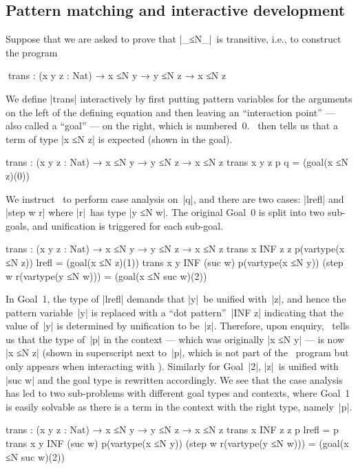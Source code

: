 \subsection{Pattern matching and interactive development}
\label{sec:interaction}

Suppose that we are asked to prove that |_≤N_|~is transitive, i.e., to construct the program
\begin{code}
^^^trans : (x y z : Nat) → x ≤N y → y ≤N z → x ≤N z
\end{code}
We define |trans| interactively by first putting pattern variables for the arguments on the left of the defining equation and then leaving an ``interaction point'' --- also called a ``goal'' --- on the right, which is numbered~0.
\Agda\ then tells us that a term of type |x ≤N z| is expected (shown in the goal).
\begin{code}
trans : (x y z : Nat) → x ≤N y → y ≤N z → x ≤N z
trans x y z p q = (goal(x ≤N z)(0))
\end{code}
We instruct \Agda\ to perform case analysis on~|q|, and there are two cases: |lrefl| and |step w r| where |r|~has type |y ≤N w|.
The original Goal~0 is split into two sub-goals, and unification is triggered for each sub-goal.
\begin{code}
trans : (x y z : Nat) → x ≤N y → y ≤N z → x ≤N z
trans x  INF  z        z        p(vartype(x ≤N z))  lrefl                        = (goal(x ≤N z)(1))
trans x       y   INF  (suc w)  p(vartype(x ≤N y))  (step w r(vartype(y ≤N w)))  = (goal(x ≤N suc w)(2))
\end{code}
In Goal~1, the type of |lrefl| demands that |y|~be unified with~|z|, and hence the pattern variable~|y| is replaced with a ``dot pattern''~|INF z| indicating that the value of~|y| is determined by unification to be~|z|.
Therefore, upon enquiry, \Agda\ tells us that the type of~|p| in the context --- which was originally |x ≤N y| --- is now |x ≤N z| (shown in superscript next to~|p|, which is not part of the \Agda\ program but only appears when interacting with \Agda).
Similarly for Goal~|2|, |z|~is unified with |suc w| and the goal type is rewritten accordingly.
We see that the case analysis has led to two sub-problems with different goal types and contexts, where Goal~1 is easily solvable as there is a term in the context with the right type, namely~|p|.
\begin{code}
trans : (x y z : Nat) → x ≤N y → y ≤N z → x ≤N z
trans x  INF  z       z        p                   lrefl                        = p
trans x       y  INF  (suc w)  p(vartype(x ≤N y))  (step w r(vartype(y ≤N w)))  = (goal(x ≤N suc w)(2))
\end{code}
